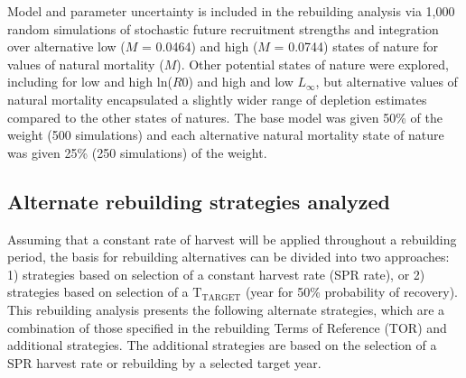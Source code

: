 \documentclass[11pt,
  english,
  a4paper,
]{article}
\begin{document}
Model and parameter uncertainty is included in the rebuilding analysis via 1,000 random simulations of stochastic future recruitment strengths and integration over alternative low ({\(M\)\leavevmode\tagmcend\tagstructend} = 0.0464) and high ({\(M\)\leavevmode\tagmcend\tagstructend} = 0.0744) states of nature for values of natural mortality ({\(M\)\leavevmode\tagmcend\tagstructend}). Other potential states of nature were explored, including for low and high ln({\(R0\)\leavevmode\tagmcend\tagstructend}) and high and low {\(L_{\infty}\)\leavevmode\tagmcend\tagstructend}, but alternative values of natural mortality encapsulated a slightly wider range of depletion estimates compared to the other states of natures. The base model was given 50\% of the weight (500 simulations) and each alternative natural mortality state of nature was given 25\% (250 simulations) of the weight.

\leavevmode\tagmcend\tagstructend\par


\hypertarget{alternate-rebuilding-strategies-analyzed}{%
\subsection{Alternate rebuilding strategies analyzed}\label{alternate-rebuilding-strategies-analyzed}}

\leavevmode\tagmcend\tagstructend


Assuming that a constant rate of harvest will be applied throughout a rebuilding period, the basis for rebuilding alternatives can be divided into two approaches: 1) strategies based on selection of a constant harvest rate (SPR rate), or 2) strategies based on selection of a {\(\text{T}_\text{TARGET}\)\leavevmode\tagmcend\tagstructend} (year for 50\% probability of recovery). This rebuilding analysis presents the following alternate strategies, which are a combination of those specified in the rebuilding Terms of Reference (TOR) and additional strategies. The additional strategies are based on the selection of a SPR harvest rate or rebuilding by a selected target year.
\end{document}
